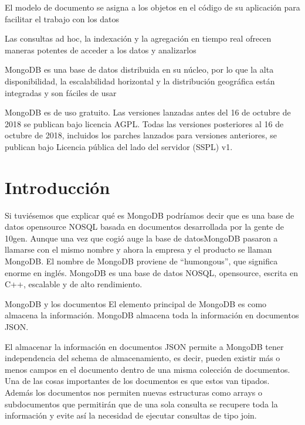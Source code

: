 \documentclass[preprint,12pt]{elsarticle}
\begin{document}
El modelo de documento se asigna a los objetos en el código de su aplicación para facilitar el trabajo con los datos

Las consultas ad hoc, la indexación y la agregación en tiempo real ofrecen maneras potentes de acceder a los datos y analizarlos

MongoDB es una base de datos distribuida en su núcleo, por lo que la alta disponibilidad, la escalabilidad horizontal y la distribución geográfica están integradas y son fáciles de usar

MongoDB es de uso gratuito. Las versiones lanzadas antes del 16 de octubre de 2018 se publican bajo licencia AGPL. Todas las versiones posteriores al 16 de octubre de 2018, incluidos los parches lanzados para versiones anteriores, se publican bajo Licencia pública del lado del servidor (SSPL) v1.





\section{Introducción} 
Si tuviésemos que explicar qué es MongoDB podríamos decir que es una base de datos opensource NOSQL basada en documentos desarrollada por la gente de 10gen. Aunque una vez que cogió auge la base de datosMongoDB pasaron a llamarse con el mismo nombre y ahora la empresa y el producto se llaman MongoDB. El nombre de MongoDB proviene de “humongous”, que significa enorme en inglés. MongoDB es una base de datos NOSQL, opensource, escrita en C++, escalable y de alto rendimiento.

MongoDB y los documentos
El elemento principal de MongoDB es como almacena la información. MongoDB almacena toda la información en documentos JSON.

El almacenar la información en documentos JSON permite a MongoDB tener independencia del schema de almacenamiento, es decir, pueden existir más o menos campos en el documento dentro de una misma colección de documentos. Una de las cosas importantes de los documentos es que estos van tipados. Además los documentos nos permiten nuevas estructuras como arrays o subdocumentos que permitirán que de una sola consulta se recupere toda la información y evite así la necesidad de ejecutar consultas de tipo join.
\end{document}
